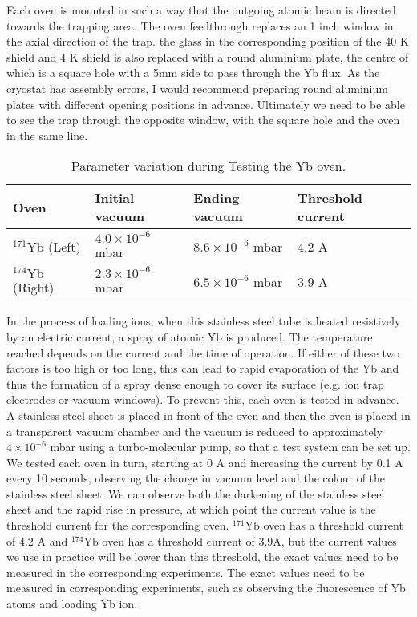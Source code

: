Each oven is mounted in such a way that the outgoing atomic beam is directed towards the trapping area. The oven feedthrough replaces an 1 inch window in the axial direction of the trap. the glass in the corresponding position of the 40 K shield and 4 K shield is also replaced with a round aluminium plate, the centre of which is a square hole with a 5mm side to pass through the Yb flux. As the cryostat has assembly errors, I would recommend preparing round aluminium plates with different opening positions in advance. Ultimately we need to be able to see the trap through the opposite window, with the square hole and the oven in the same line.

\begin{table}
    \centering
    \caption{Parameter variation during Testing the Yb oven.}
    \begin{tabular}{llll}
        \toprule
        Oven                            & Initial vacuum              & Ending vacuum               & Threshold current \\

        \midrule
        ${ }^{171} \mathrm{Yb}$ (Left)  & $4.0 \times {10}^{-6}$ mbar & $8.6 \times {10}^{-6}$ mbar & 4.2 A             \\
        ${ }^{174} \mathrm{Yb}$ (Right) & $2.3 \times {10}^{-6}$ mbar & $6.5 \times {10}^{-6}$ mbar & 3.9 A             \\
        \bottomrule
    \end{tabular}
\end{table}


In the process of loading ions, when this stainless steel tube is heated resistively by an electric current, a spray of atomic Yb is produced. The temperature reached depends on the current and the time of operation. If either of these two factors is too high or too long, this can lead to rapid evaporation of the Yb and thus the formation of a spray dense enough to cover its surface (e.g. ion trap electrodes or vacuum windows). To prevent this, each oven is tested in advance. A stainless steel sheet is placed in front of the oven and then the oven is placed in a transparent vacuum chamber and the vacuum is reduced to approximately $4 \times {10}^{-6}$ mbar using a turbo-molecular pump, so that a test system can be set up. We tested each oven in turn, starting at 0 A and increasing the current by 0.1 A every 10 seconds, observing the change in vacuum level and the colour of the stainless steel sheet. We can observe both the darkening of the stainless steel sheet and the rapid rise in pressure, at which point the current value is the threshold current for the corresponding oven. ${ }^{171} \mathrm{Yb}$ oven has a threshold current of 4.2 A and ${ }^{174} \mathrm{Yb}$ oven has a threshold current of 3.9A, but the current values we use in practice will be lower than this threshold, the exact values need to be measured in the corresponding experiments. The exact values need to be measured in corresponding experiments, such as observing the fluorescence of Yb atoms and loading Yb ion.




